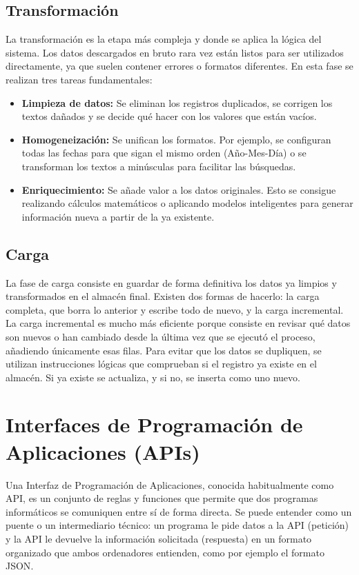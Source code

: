 \subsection{Transformación}
La transformación es la etapa más compleja y donde se aplica la lógica del sistema. Los datos descargados en bruto rara vez están listos para ser utilizados directamente, ya que suelen contener errores o formatos diferentes. En esta fase se realizan tres tareas fundamentales:
\begin{itemize}
    \item \textbf{Limpieza de datos:} Se eliminan los registros duplicados, se corrigen los textos dañados y se decide qué hacer con los valores que están vacíos.
    \item \textbf{Homogeneización:} Se unifican los formatos. Por ejemplo, se configuran todas las fechas para que sigan el mismo orden (Año-Mes-Día) o se transforman los textos a minúsculas para facilitar las búsquedas.
    \item \textbf{Enriquecimiento:} Se añade valor a los datos originales. Esto se consigue realizando cálculos matemáticos o aplicando modelos inteligentes para generar información nueva a partir de la ya existente.
\end{itemize}

\subsection{Carga}
La fase de carga consiste en guardar de forma definitiva los datos ya limpios y transformados en el almacén final. Existen dos formas de hacerlo: la carga completa, que borra lo anterior y escribe todo de nuevo, y la carga incremental. La carga incremental es mucho más eficiente porque consiste en revisar qué datos son nuevos o han cambiado desde la última vez que se ejecutó el proceso, añadiendo únicamente esas filas. Para evitar que los datos se dupliquen, se utilizan instrucciones lógicas que comprueban si el registro ya existe en el almacén. Si ya existe se actualiza, y si no, se inserta como uno nuevo.

\section{Interfaces de Programación de Aplicaciones (APIs)}
Una Interfaz de Programación de Aplicaciones, conocida habitualmente como API, es un conjunto de reglas y funciones que permite que dos programas informáticos se comuniquen entre sí de forma directa. Se puede entender como un puente o un intermediario técnico: un programa le pide datos a la API (petición) y la API le devuelve la información solicitada (respuesta) en un formato organizado que ambos ordenadores entienden, como por ejemplo el formato JSON\cite{mdn_api_rest}.

